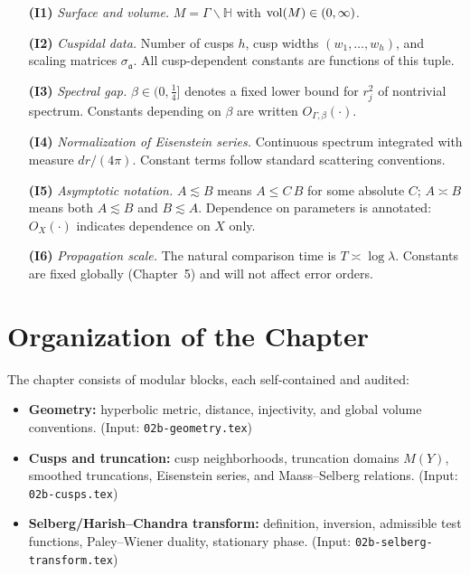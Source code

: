 \begin{itemize}[leftmargin=2em]
  \item[\textbf{(I1)}] \textit{Surface and volume.}
  $M=\Gamma\backslash\mathbb{H}$ with $\operatorname{vol}(M)\in(0,\infty)$.

  \item[\textbf{(I2)}] \textit{Cuspidal data.}
  Number of cusps $h$, cusp widths $(w_1,\dots,w_h)$,
  and scaling matrices $\sigma_\mathfrak{a}$.
  All cusp-dependent constants are functions of this tuple.

  \item[\textbf{(I3)}] \textit{Spectral gap.}
  $\beta\in(0,\tfrac14]$ denotes a fixed lower bound for
  $r_j^2$ of nontrivial spectrum.
  Constants depending on $\beta$ are written $O_{\Gamma,\beta}(\cdot)$.

  \item[\textbf{(I4)}] \textit{Normalization of Eisenstein series.}
  Continuous spectrum integrated with measure $dr/(4\pi)$.
  Constant terms follow standard scattering conventions.

  \item[\textbf{(I5)}] \textit{Asymptotic notation.}
  $A\lesssim B$ means $A\le C\,B$ for some absolute $C$;
  $A\asymp B$ means both $A\lesssim B$ and $B\lesssim A$.
  Dependence on parameters is annotated:
  $O_X(\cdot)$ indicates dependence on $X$ only.

  \item[\textbf{(I6)}] \textit{Propagation scale.}
  The natural comparison time is $T\asymp\log\lambda$.
  Constants are fixed globally (Chapter~5) and will not affect error orders.
\end{itemize}

\section*{Organization of the Chapter}

The chapter consists of modular blocks, each self-contained and audited:

\begin{itemize}[leftmargin=2em]
  \item \textbf{Geometry:} hyperbolic metric, distance, injectivity, and
        global volume conventions.
        (Input: \texttt{02b-geometry.tex})

  \item \textbf{Cusps and truncation:} cusp neighborhoods, truncation
        domains $M(Y)$, smoothed truncations, Eisenstein series, and
        Maass–Selberg relations.
        (Input: \texttt{02b-cusps.tex})

  \item \textbf{Selberg/Harish–Chandra transform:} definition, inversion,
        admissible test functions, Paley–Wiener duality, stationary phase.
        (Input: \texttt{02b-selberg-transform.tex})
\end{itemize}

